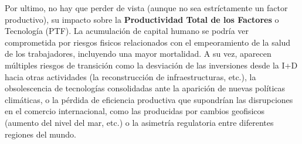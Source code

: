 \documentclass[10pt,a4paper]{article}
\begin{document}
Por ultimo, no hay que perder de vista (aunque no sea estríctamente un factor productivo), su impacto sobre la \textbf{Productividad Total de los Factores} o Tecnología (PTF). La acumulación de capital humano se podría ver comprometida por riesgos fisicos relacionados con el empeoramiento de la salud de los trabajadores, incluyendo una mayor mortalidad. A su vez, aparecen múltiples riesgos de transición como la desviación de las inversiones desde la I+D hacia otras actividades (la reconstrucción de infraestructuras, etc.), la obsolescencia de tecnologías consolidadas ante la aparición de nuevas políticas climáticas, o la pérdida de eficiencia productiva que supondrían las disrupciones en el comercio internacional, como las producidas por cambios geofisicos (aumento del nivel del mar, etc.) o la asimetría regulatoria entre diferentes regiones del mundo. 
\end{document}
